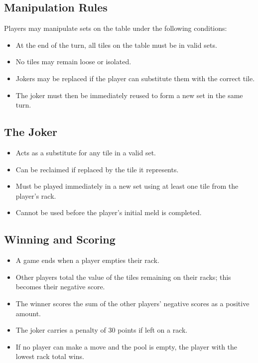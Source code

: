 \documentclass[11pt,letterpaper]{article}
\begin{document}
\subsection*{Manipulation Rules}
Players may manipulate sets on the table under the following conditions:
\begin{itemize}
    \item At the end of the turn, all tiles on the table must be in valid sets.
    \item No tiles may remain loose or isolated.
    \item Jokers may be replaced if the player can substitute them with the correct tile.
    \item The joker must then be immediately reused to form a new set in the same turn.
\end{itemize}

\subsection*{The Joker}
\begin{itemize}
    \item Acts as a substitute for any tile in a valid set.
    \item Can be reclaimed if replaced by the tile it represents.
    \item Must be played immediately in a new set using at least one tile from the player’s rack.
    \item Cannot be used before the player's initial meld is completed.
\end{itemize}

\subsection*{Winning and Scoring}
\begin{itemize}
    \item A game ends when a player empties their rack.
    \item Other players total the value of the tiles remaining on their racks; this becomes their negative score.
    \item The winner scores the sum of the other players’ negative scores as a positive amount.
    \item The joker carries a penalty of 30 points if left on a rack.
    \item If no player can make a move and the pool is empty, the player with the lowest rack total wins.
\end{itemize}
\end{document}
